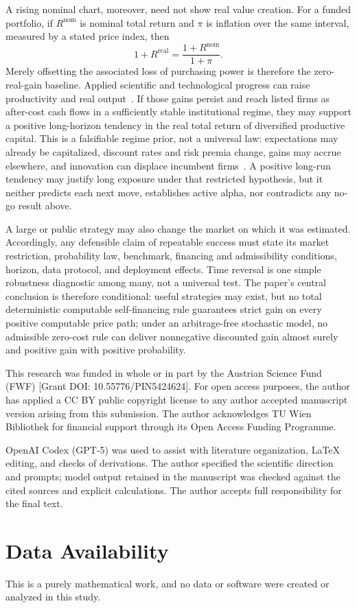 \documentclass[aps,pra,reprint,superscriptaddress,amsmath,amssymb,floatfix]{revtex4-2}
\theoremstyle{plain}
\theoremstyle{definition}
\theoremstyle{remark}
\begin{document}
A rising nominal chart, moreover, need not show real value creation. For a
funded portfolio, if \(R^{\mathrm{nom}}\) is nominal total return and \(\pi\)
is inflation over the same interval, measured by a stated price index, then
\begin{equation}
  1+R^{\mathrm{real}}
  =\frac{1+R^{\mathrm{nom}}}{1+\pi}.
  \label{eq:real-return}
\end{equation}
Merely offsetting the associated loss of purchasing power is therefore the
zero-real-gain baseline. Applied scientific and technological progress can
raise productivity and real output~\cite{Solow1957}. If those gains persist
and reach listed firms as after-cost cash flows in a sufficiently stable
institutional regime, they may support a positive long-horizon tendency in the
real total return of diversified productive capital. This is a falsifiable
regime prior, not a universal law: expectations may already be capitalized,
discount rates and risk premia change, gains may accrue elsewhere, and
innovation can displace incumbent firms~\cite{Schumpeter1942}. A positive
long-run tendency may justify long exposure under that restricted hypothesis,
but it neither predicts each next move, establishes active alpha, nor
contradicts any no-go result above.

A large or public strategy may also change the market on which it was
estimated. Accordingly, any defensible claim of repeatable success must state
its market restriction, probability law, benchmark, financing and
admissibility conditions, horizon, data protocol, and deployment effects.
Time reversal is one simple robustness diagnostic among many, not a universal
test. The paper's central conclusion is therefore conditional: useful
strategies may exist, but no total deterministic computable self-financing rule
guarantees strict gain on every positive computable price path; under an
arbitrage-free stochastic model, no admissible zero-cost rule can deliver
nonnegative discounted gain almost surely and positive gain with positive
probability.

\begin{acknowledgments}
This research was funded in whole or in part by the Austrian Science Fund
(FWF) [Grant DOI: 10.55776/PIN5424624]. For open access purposes, the author
has applied a CC BY public copyright license to any author accepted manuscript
version arising from this submission. The author acknowledges TU Wien
Bibliothek for financial support through its Open Access Funding Programme.

OpenAI Codex (GPT-5) was used to assist with literature organization, LaTeX
editing, and checks of derivations. The author specified the scientific
direction and prompts; model output retained in the manuscript was checked
against the cited sources and explicit calculations. The author accepts full
responsibility for the final text.
\end{acknowledgments}

\section*{Data Availability}
This is a purely mathematical work, and no data or software were created or
analyzed in this study.


\end{document}
